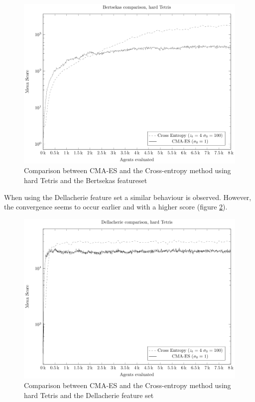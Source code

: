 \begin{figure}[H]
\begin{center}
\includegraphics[scale=0.8]{plots/plotBertsekasCmaVsCEHardTetris}
\end{center}
\caption{Comparison between CMA-ES and the Cross-entropy method
using hard Tetris and the Bertsekas featureset 
\label{fig:featuresetCompareBertsekas}}
\end{figure}

When using the Dellacherie feature set a similar behaviour is observed.
However, the convergence seems to occur earlier and with a higher score
(figure \ref{fig:featuresetCompareDellacherie}).

\begin{figure}[H]
\begin{center}
\includegraphics[scale=0.8]{plots/plotDellCmaVsCEHardTetris}
\end{center}
\caption{Comparison between CMA-ES and the Cross-entropy method 
using hard Tetris and the Dellacherie feature set
\label{fig:featuresetCompareDellacherie}}
\end{figure}


